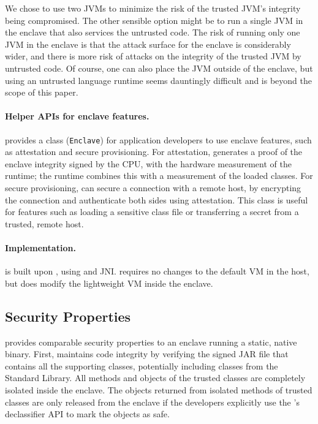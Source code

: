 We chose to use two JVMs to minimize the risk of the trusted JVM's integrity 
being compromised.  The other sensible option might be to 
run a single JVM in the enclave that also services the untrusted code.
The risk of running only one JVM in the enclave is that the attack surface for the enclave is considerably
wider, and there is more risk of attacks on the integrity of the trusted JVM by untrusted code.
Of course, one can also place the JVM outside of the enclave, but using an untrusted language runtime
seems dauntingly difficult and is beyond the scope of this paper.



\paragraph{Helper APIs for enclave features.}
\sysname{} provides a \java{} class ({\tt Enclave}) for application developers
to use enclave features, such as attestation and secure provisioning.
For attestation, \sysname{} generates a proof of the enclave integrity signed by the CPU,
with the hardware measurement of the \sysname{} runtime;
the \sysname{} runtime combines this with a measurement of the loaded classes.
For secure provisioning,
\sysname{} can secure a connection with a remote host,
by encrypting the connection and authenticate both sides using attestation.
This class is useful for features such as loading a sensitive class file or transferring
a secret 
from a trusted, remote host.

\paragraph{Implementation.} \sysname{} is built upon \jvm{}, using \java{} and JNI.
\sysname{} requires no changes to the default \java{} VM in the host,
but does modify the lightweight \java{} VM inside the enclave.

\subsection{Security Properties}

\sysname{} provides comparable security properties to an enclave running a static, native binary.
First, \sysname{} maintains code integrity by verifying the signed JAR file that contains all the supporting classes, potentially including classes from the \java{} Standard Library.
All methods and objects of the trusted classes are completely isolated 
inside the \sgx{} enclave.
The objects returned from isolated methods of trusted classes are only released
from the enclave if the developers explicitly use the \sysname{}'s declassifier API to mark the objects as safe.

